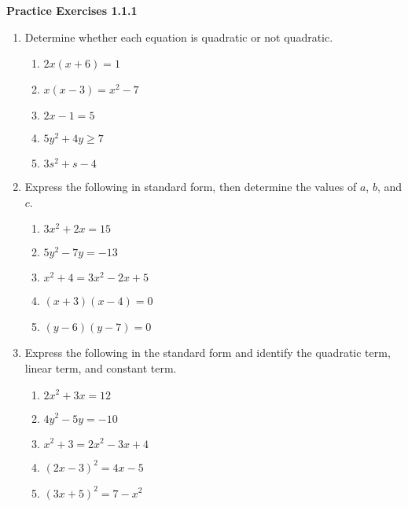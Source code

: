 \vspace{1ex}
\noindent\textbf{Practice Exercises 1.1.1}

\vspace{0.75ex}

\begin{enumerate}[label = \color{blue} \Alph*. ]
   \item Determine whether each equation is quadratic or not quadratic.
\begin{multicols}{3}
\begin{enumerate}[label = \color{blue}\arabic*. ] 
   \item $ 2x(x+6)=1 $
   \item $ x(x-3)=x^2-7 $
   \item $ 2x - 1 = 5 $
   \item $ 5y^2 + 4y \geq 7 $
   \item $ 3s^2 + s - 4 $
\end{enumerate}
\end{multicols}
				 
   \item Express the following in standard form, then determine the values of $a$, $b$, and $c$.
\begin{multicols}{3}
\begin{enumerate}[label = \color{blue} \arabic*. ]
   \item $ 3x^2 + 2x = 15 $

   \item $ 5y^2 - 7y = -13 $
   \item $ x^2 + 4 = 3x^2 - 2x + 5 $
   \item $ (x+3)(x-4) = 0 $
   \item $ (y-6)(y-7) = 0 $
\end{enumerate}
\end{multicols}
		 
   \item Express the following in the standard form and identify the quadratic term, linear term, and constant term.
\begin{multicols}{3}
\begin{enumerate}[label = \color{blue}\arabic*. ]
   \item $ 2x^2 + 3x = 12 $

   \item $ 4y^2 - 5y = -10 $
   \item $ x^2 + 3 = 2x^2 - 3x + 4 $
   \item $ (2x-3)^2 = 4x - 5 $
   \item $ (3x + 5)^2 = 7 - x^2 $ 
\end{enumerate}
\end{multicols}
	 
\end{enumerate}
				
				
